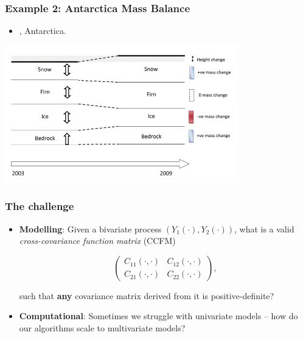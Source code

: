 \documentclass{beamer}
\begin{document}

\begin{frame}
\frametitle{Example 2: Antarctica Mass Balance}

\begin{itemize}
\item \citet{Zammit_2014,Zammit_2015a,Zammit_2015b}, Antarctica.
\end{itemize}


\begin{center}
\includegraphics[width=4in]{./Obs.png}
\end{center}

\end{frame}


\begin{frame}
\frametitle{The challenge}

\begin{itemize}

\item {\bf Modelling}: Given a bivariate process $(Y_1(\cdot), Y_2(\cdot))$, what is a valid \emph{cross-covariance function matrix} (CCFM)

\begin{equation}
\left(\begin{array}{cc} C_{11}(\cdot,\cdot) & C_{12}(\cdot,\cdot) \\ C_{21}(\cdot,\cdot) & C_{22}(\cdot,\cdot)\end{array} \right),
\end{equation}

such that {\bf any} covariance matrix derived from it is positive-definite? \vfill

\item {\bf Computational}: Sometimes we struggle with univariate models -- how do our algorithms scale to multivariate models? \vfill
\end{itemize}
\end{frame}
\end{document}
